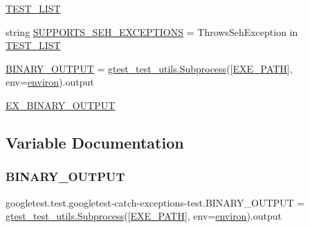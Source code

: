 \begin{DoxyCompactItemize}
\item 
\mbox{\hyperlink{namespacegoogletest_1_1test_1_1googletest-catch-exceptions-test_a6cafce1ac516550dfffe5d164b13e5a9}{T\+E\+S\+T\+\_\+\+L\+I\+ST}}
\item 
string \mbox{\hyperlink{namespacegoogletest_1_1test_1_1googletest-catch-exceptions-test_a603a95200c33cee520eb357d53e7b157}{S\+U\+P\+P\+O\+R\+T\+S\+\_\+\+S\+E\+H\+\_\+\+E\+X\+C\+E\+P\+T\+I\+O\+NS}} = \textquotesingle{}Throws\+Seh\+Exception\textquotesingle{} in \mbox{\hyperlink{namespacegoogletest_1_1test_1_1googletest-catch-exceptions-test_a6cafce1ac516550dfffe5d164b13e5a9}{T\+E\+S\+T\+\_\+\+L\+I\+ST}}
\item 
\mbox{\hyperlink{namespacegoogletest_1_1test_1_1googletest-catch-exceptions-test_a0f7774e8122b46eba43b2f4bc4442ca9}{B\+I\+N\+A\+R\+Y\+\_\+\+O\+U\+T\+P\+UT}} = \mbox{\hyperlink{classgoogletest_1_1test_1_1gtest__test__utils_1_1_subprocess}{gtest\+\_\+test\+\_\+utils.\+Subprocess}}(\mbox{[}\mbox{\hyperlink{namespacegoogletest_1_1test_1_1googletest-catch-exceptions-test_a410cb8694539d864ade93a277bb03fa5}{E\+X\+E\+\_\+\+P\+A\+TH}}\mbox{]}, env=\mbox{\hyperlink{namespacegoogletest_1_1test_1_1googletest-catch-exceptions-test_a31db01bdbed9bc5476d4747cacb3b668}{environ}}).output
\item 
\mbox{\hyperlink{namespacegoogletest_1_1test_1_1googletest-catch-exceptions-test_a0b8a12544418a059abfd895bbf7abe2e}{E\+X\+\_\+\+B\+I\+N\+A\+R\+Y\+\_\+\+O\+U\+T\+P\+UT}}
\end{DoxyCompactItemize}


\subsection{Variable Documentation}
\mbox{\label{namespacegoogletest_1_1test_1_1googletest-catch-exceptions-test_a0f7774e8122b46eba43b2f4bc4442ca9}} 
\subsubsection{\texorpdfstring{BINARY\_OUTPUT}{BINARY\_OUTPUT}}
{\footnotesize\ttfamily googletest.\+test.\+googletest-\/catch-\/exceptions-\/test.\+B\+I\+N\+A\+R\+Y\+\_\+\+O\+U\+T\+P\+UT = \mbox{\hyperlink{classgoogletest_1_1test_1_1gtest__test__utils_1_1_subprocess}{gtest\+\_\+test\+\_\+utils.\+Subprocess}}(\mbox{[}\mbox{\hyperlink{namespacegoogletest_1_1test_1_1googletest-catch-exceptions-test_a410cb8694539d864ade93a277bb03fa5}{E\+X\+E\+\_\+\+P\+A\+TH}}\mbox{]}, env=\mbox{\hyperlink{namespacegoogletest_1_1test_1_1googletest-catch-exceptions-test_a31db01bdbed9bc5476d4747cacb3b668}{environ}}).output}

